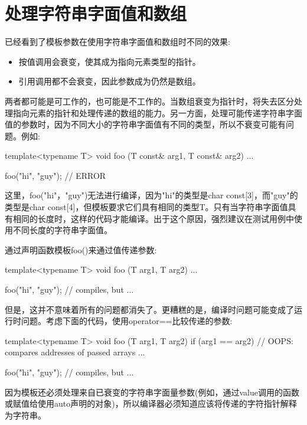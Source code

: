 \section{处理字符串字面值和数组}

已经看到了模板参数在使用字符串字面值和数组时不同的效果:

\begin{itemize}
\item 
按值调用会衰变，使其成为指向元素类型的指针。

\item 
引用调用都不会衰变，因此参数成为仍然是数组。
\end{itemize}

两者都可能是可工作的，也可能是不工作的。当数组衰变为指针时，将失去区分处理指向元素的指针和处理传递的数组的能力。另一方面，处理可能传递字符串字面值的参数时，因为不同大小的字符串字面值有不同的类型，所以不衰变可能有问题。例如:

\begin{cpp}
template<typename T>
void foo (T const& arg1, T const& arg2)
{
	...
}

foo("hi", "guy"); // ERROR
\end{cpp}

这里，foo("hi"，"guy")无法进行编译，因为"hi"的类型是char const[3]，而"guy"的类型是char const[4]，但模板要求它们具有相同的类型T。只有当字符串字面值具有相同的长度时，这样的代码才能编译。出于这个原因，强烈建议在测试用例中使用不同长度的字符串字面值。

通过声明函数模板foo()来通过值传递参数:

\begin{cpp}
template<typename T>
void foo (T arg1, T arg2)
{
	...
}

foo("hi", "guy"); // compiles, but ...
\end{cpp}

但是，这并不意味着所有的问题都消失了。更糟糕的是，编译时问题可能变成了运行时问题。考虑下面的代码，使用operator==比较传递的参数:

\begin{cpp}
template<typename T>
void foo (T arg1, T arg2)
{
	if (arg1 == arg2) { // OOPS: compares addresses of passed arrays
		...
	}
}

foo("hi", "guy"); // compiles, but ...
\end{cpp}

因为模板还必须处理来自已衰变的字符串字面量参数(例如，通过value调用的函数或赋值给使用auto声明的对象)，所以编译器必须知道应该将传递的字符指针解释为字符串。

